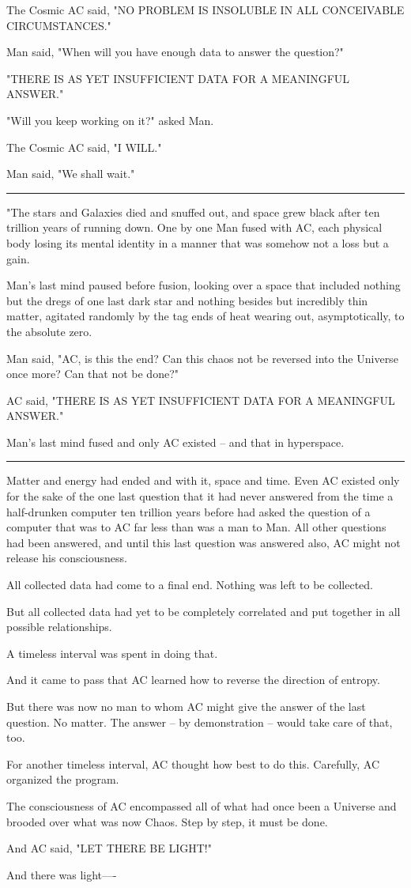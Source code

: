 \documentclass[11pt]{article}
\newcommand{\sep}[0]{\vspace{.5cm}\hrule\vspace{.5cm}}
\begin{document}
The Cosmic AC said, "NO PROBLEM IS INSOLUBLE IN ALL CONCEIVABLE CIRCUMSTANCES."

Man said, "When will you have enough data to answer the question?"

"THERE IS AS YET INSUFFICIENT DATA FOR A MEANINGFUL ANSWER."

"Will you keep working on it?" asked Man.

The Cosmic AC said, "I WILL."

Man said, "We shall wait."

\sep{}

"The stars and Galaxies died and snuffed out, and space grew black after ten trillion years of running down.
One by one Man fused with AC, each physical body losing its mental identity in a manner that was somehow not a loss but a gain.

Man's last mind paused before fusion, looking over a space that included nothing but the dregs of one last dark star and nothing besides but incredibly thin matter, agitated randomly by the tag ends of heat wearing out, asymptotically, to the absolute zero.

Man said, "AC, is this the end? Can this chaos not be reversed into the Universe once more? Can that not be done?"

AC said, "THERE IS AS YET INSUFFICIENT DATA FOR A MEANINGFUL ANSWER."

Man's last mind fused and only AC existed -- and that in hyperspace.

\sep{}

Matter and energy had ended and with it, space and time. Even AC existed only for the sake of the one last question that it had never answered from the time a half-drunken computer ten trillion years before had asked the question of a computer that was to AC far less than was a man to Man.
All other questions had been answered, and until this last question was answered also, AC might not release his consciousness.

All collected data had come to a final end. Nothing was left to be collected.

But all collected data had yet to be completely correlated and put together in all possible relationships.

A timeless interval was spent in doing that.

And it came to pass that AC learned how to reverse the direction of entropy.

But there was now no man to whom AC might give the answer of the last question. No matter. The answer -- by demonstration -- would take care of that, too.

For another timeless interval, AC thought how best to do this. Carefully, AC organized the program.

The consciousness of AC encompassed all of what had once been a Universe and brooded over what was now Chaos. Step by step, it must be done.

And AC said, "LET THERE BE LIGHT!"

And there was light----

\fontsize{40pt}{40pt}
\selectfont 
\center
\hspace{2.7cm}
\color{light-gray}
\end{document}
